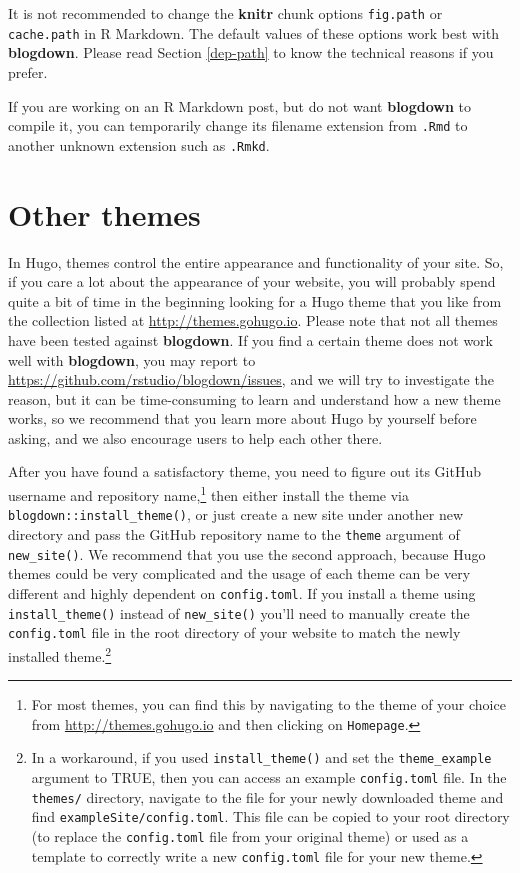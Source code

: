 \documentclass[12pt,]{krantz}
\theoremstyle{definition}
\theoremstyle{definition}
\theoremstyle{definition}
\theoremstyle{remark}
\begin{document}
It is not recommended to change the \textbf{knitr} chunk options
\texttt{fig.path} or \texttt{cache.path} in R Markdown. The default
values of these options work best with \textbf{blogdown}. Please read
Section \ref{dep-path} to know the technical reasons if you prefer.

If you are working on an R Markdown post, but do not want
\textbf{blogdown} to compile it, you can temporarily change its filename
extension from \texttt{.Rmd} to another unknown extension such as
\texttt{.Rmkd}.

\hypertarget{other-themes}{%
\section{Other themes}\label{other-themes}}

In Hugo, themes control the entire appearance and
functionality of your site. So, if you care a lot about the appearance
of your website, you will probably spend quite a bit of time in the
beginning looking for a Hugo theme that you like from the collection
listed at \url{http://themes.gohugo.io}. Please note that not all themes
have been tested against \textbf{blogdown}. If you find a certain theme
does not work well with \textbf{blogdown}, you may report to
\url{https://github.com/rstudio/blogdown/issues}, and we will try to
investigate the reason, but it can be time-consuming to learn and
understand how a new theme works, so we recommend that you learn more
about Hugo by yourself before asking, and we also encourage users to
help each other there.

After you have found a satisfactory theme, you need to figure out its
GitHub username and repository name,\footnote{For most themes, you can
  find this by navigating to the theme of your choice from
  \url{http://themes.gohugo.io} and then clicking on \texttt{Homepage}.}
then either install the theme via
\texttt{blogdown::install\_theme()}, or just create a new site under
another new directory and pass the GitHub repository name to the
\texttt{theme} argument of \texttt{new\_site()}. We recommend that you
use the second approach, because Hugo themes could be very complicated
and the usage of each theme can be very different and highly dependent
on \texttt{config.toml}. If you install a theme using
\texttt{install\_theme()} instead of \texttt{new\_site()} you'll need to
manually create the \texttt{config.toml} file in the root directory of
your website to match the newly installed theme.\footnote{In a
  workaround, if you used \texttt{install\_theme()} and set the
  \texttt{theme\_example} argument to TRUE, then you can access an
  example \texttt{config.toml} file. In the \texttt{themes/} directory,
  navigate to the file for your newly downloaded theme and find
  \texttt{exampleSite/config.toml}. This file can be copied to your root
  directory (to replace the \texttt{config.toml} file from your original
  theme) or used as a template to correctly write a new
  \texttt{config.toml} file for your new theme.}
\end{document}
